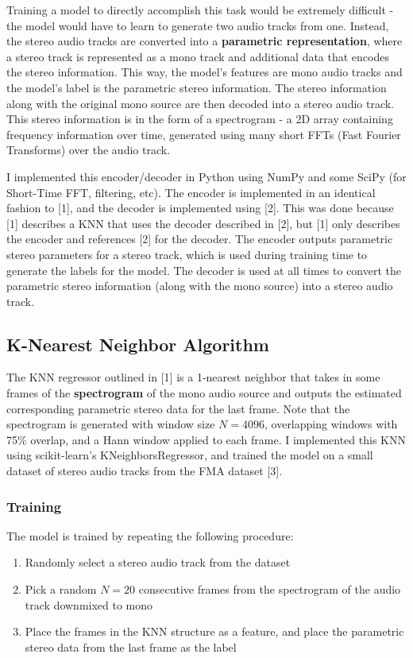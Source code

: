 \documentclass{article}
\begin{document}
Training a model to directly accomplish this task would be extremely difficult - the model would have to learn to generate two audio tracks from one. Instead, the stereo audio tracks are converted into a \textbf{parametric representation}, where a stereo track is represented as a mono track and additional data that encodes the stereo information. This way, the model's features are mono audio tracks and the model's label is the parametric stereo information. The stereo information along with the original mono source are then decoded into a stereo audio track. This stereo information is in the form of a spectrogram - a 2D array containing frequency information over time, generated using many short FFTs (Fast Fourier Transforms) over the audio track.

I implemented this encoder/decoder in Python using NumPy and some SciPy (for Short-Time FFT, filtering, etc). The encoder is implemented in an identical fashion to [1], and the decoder is implemented using [2]. This was done because [1] describes a KNN that uses the decoder described in [2], but [1] only describes the encoder and references [2] for the decoder. The encoder outputs parametric stereo parameters for a stereo track, which is used during training time to generate the labels for the model. The decoder is used at all times to convert the parametric stereo information (along with the mono source) into a stereo audio track.

\subsection{K-Nearest Neighbor Algorithm}
The KNN regressor outlined in [1] is a 1-nearest neighbor that takes in some frames of the \textbf{spectrogram} of the mono audio source and outputs the estimated corresponding parametric stereo data for the last frame. Note that the spectrogram is generated with window size $N=4096$, overlapping windows with 75\% overlap, and a Hann window applied to each frame. I implemented this KNN using scikit-learn's KNeighborsRegressor, and trained the model on a small dataset of stereo audio tracks from the FMA dataset [3].

\subsubsection{Training}
The model is trained by repeating the following procedure:
\begin{enumerate}
  \item Randomly select a stereo audio track from the dataset
  \item Pick a random $N=20$ consecutive frames from the spectrogram of the audio track downmixed to mono
  \item Place the frames in the KNN structure as a feature, and place the parametric stereo data from the last frame as the label
\end{enumerate}
\end{document}

